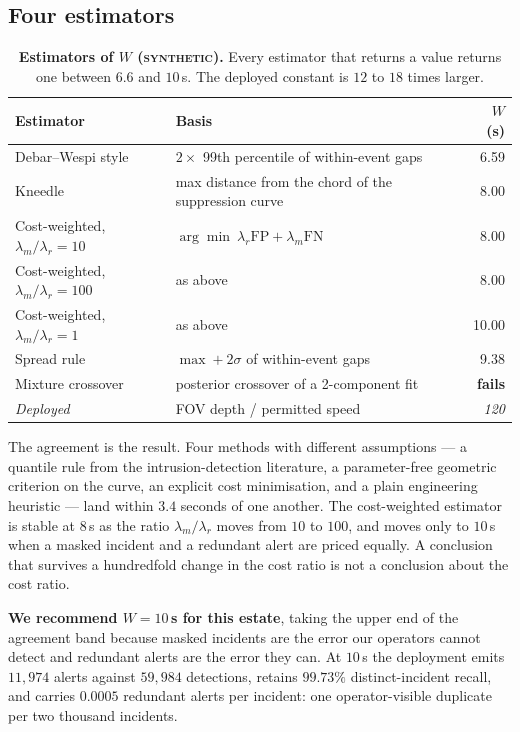 \documentclass[11pt,a4paper]{article}
\newcommand{\synth}{\textsc{synthetic}}
\begin{document}
\subsection{Four estimators}

\begin{table}[h]
\centering\small
\begin{tabular}{llr}
\toprule
\textbf{Estimator} & \textbf{Basis} & \textbf{$W$ (s)} \\
\midrule
Debar--Wespi style & $2 \times$ 99th percentile of within-event gaps & 6.59 \\
Kneedle & max distance from the chord of the suppression curve & 8.00 \\
Cost-weighted, $\lambda_m/\lambda_r = 10$ & $\arg\min\ \lambda_r \mathrm{FP} + \lambda_m \mathrm{FN}$ & 8.00 \\
Cost-weighted, $\lambda_m/\lambda_r = 100$ & as above & 8.00 \\
Cost-weighted, $\lambda_m/\lambda_r = 1$ & as above & 10.00 \\
Spread rule & $\max + 2\sigma$ of within-event gaps & 9.38 \\
\midrule
Mixture crossover & posterior crossover of a 2-component fit & \textbf{fails} \\
\midrule
\emph{Deployed} & FOV depth / permitted speed & \emph{120} \\
\bottomrule
\end{tabular}
\caption{\textbf{Estimators of $W$ (\synth).} Every estimator that returns a
value returns one between $6.6$ and $10$\,s. The deployed constant is $12$ to
$18$ times larger.}
\label{tab:estimators}
\end{table}

The agreement is the result. Four methods with different assumptions --- a
quantile rule from the intrusion-detection literature, a parameter-free
geometric criterion on the curve, an explicit cost minimisation, and a plain
engineering heuristic --- land within $3.4$ seconds of one another. The
cost-weighted estimator is stable at $8$\,s as the ratio $\lambda_m/\lambda_r$
moves from $10$ to $100$, and moves only to $10$\,s when a masked incident and a
redundant alert are priced equally. A conclusion that survives a hundredfold
change in the cost ratio is not a conclusion about the cost ratio.

\textbf{We recommend $W = 10$\,s for this estate}, taking the upper end of the
agreement band because masked incidents are the error our operators cannot
detect and redundant alerts are the error they can. At $10$\,s the deployment
emits $11{,}974$ alerts against $59{,}984$ detections, retains
$99.73\%$ distinct-incident recall, and carries $0.0005$ redundant alerts per
incident: one operator-visible duplicate per two thousand incidents.
\end{document}
